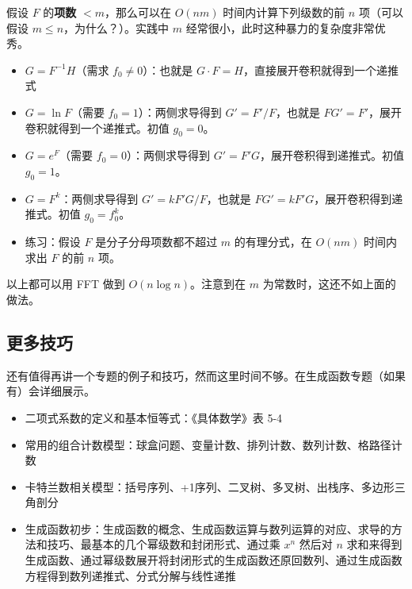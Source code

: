     假设 $F$ 的\textbf{项数} $<m$，那么可以在 $O(nm)$ 时间内计算下列级数的前 $n$ 项（可以假设 $m\le n$，为什么？）。实践中 $m$ 经常很小，此时这种暴力的复杂度非常优秀。
    \begin{itemize}
        \item $G=F^{-1}H$（需求 $f_0\ne 0$）：也就是 $G\cdot F=H$，直接展开卷积就得到一个递推式
        \item $G=\ln F$（需要 $f_0=1$）：两侧求导得到 $G'=F'/F$，也就是 $FG'=F'$，展开卷积就得到一个递推式。初值 $g_0=0$。
        \item $G=e^F$（需要 $f_0=0$）：两侧求导得到 $G'=F'G$，展开卷积得到递推式。初值 $g_0=1$。
        \item $G=F^k$：两侧求导得到 $G'=kF'G/F$，也就是 $FG'=kF'G$，展开卷积得到递推式。初值 $g_0=f_0^k$。
        \item 练习：假设 $F$ 是分子分母项数都不超过 $m$ 的有理分式，在 $O(nm)$ 时间内求出 $F$ 的前 $n$ 项。
    \end{itemize}

    以上都可以用 FFT 做到 $O(n\log n)$。注意到在 $m$ 为常数时，这还不如上面的做法。

\subsection{更多技巧}
    还有值得再讲一个专题的例子和技巧，然而这里时间不够。在生成函数专题（如果有）会详细展示。

    \begin{summary}
        \begin{itemize}
            \item 二项式系数的定义和基本恒等式：《具体数学》表 5-4
            \item 常用的组合计数模型：球盒问题、变量计数、排列计数、数列计数、格路径计数
            \item 卡特兰数相关模型：括号序列、+1序列、二叉树、多叉树、出栈序、多边形三角剖分
            \item 生成函数初步：生成函数的概念、生成函数运算与数列运算的对应、求导的方法和技巧、最基本的几个幂级数和封闭形式、通过乘 $x^n$ 然后对 $n$ 求和来得到生成函数、通过幂级数展开将封闭形式的生成函数还原回数列、通过生成函数方程得到数列递推式、分式分解与线性递推
        \end{itemize}
    \end{summary}